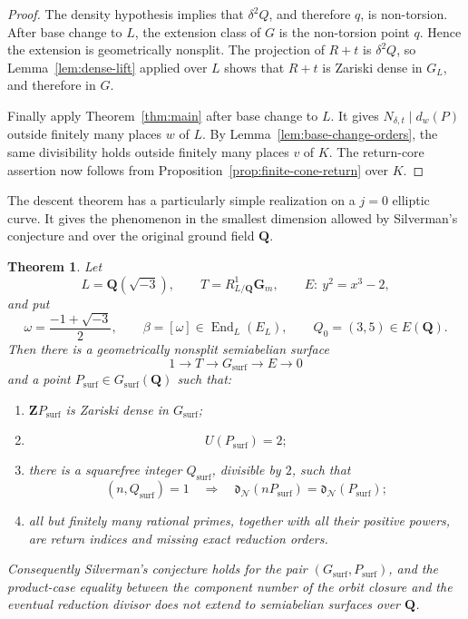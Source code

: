 \documentclass[11pt,letterpaper,reqno]{amsart}
\newtheorem{theorem}{Theorem}[section]
\theoremstyle{definition}
\theoremstyle{remark}
\newcommand{\Gm}{\mathbf G_m}
\newcommand{\Q}{\mathbf Q}
\newcommand{\End}{\operatorname{End}}
\newcommand{\dd}{\mathfrak d}
\newcommand{\Ner}{\mathcal N}
\begin{document}
\begin{proof}
The density hypothesis implies that $\delta^2Q$, and therefore $q$, is
non-torsion.  After base change to $L$, the extension class of $G$ is the
non-torsion point $q$.  Hence the extension is geometrically nonsplit.  The
projection of $R+t$ is $\delta^2Q$, so Lemma~\ref{lem:dense-lift} applied over
$L$ shows that $R+t$ is Zariski dense in $G_L$, and therefore in $G$.

Finally apply Theorem~\ref{thm:main} after base change to $L$.  It gives
$N_{\delta,t}\mid d_w(P)$ outside finitely many places $w$ of $L$.
By Lemma~\ref{lem:base-change-orders}, the same divisibility holds outside
finitely many places $v$ of $K$.  The return-core assertion now follows from
Proposition~\ref{prop:finite-cone-return} over $K$.
\end{proof}

The descent theorem has a particularly simple realization on a $j=0$ elliptic
curve.  It gives the phenomenon in the smallest dimension allowed by
Silverman's conjecture and over the original ground field $\Q$.

\begin{theorem}
\label{thm:surface-Q}
Let
\[
 L=\Q(\sqrt{-3}),
 \qquad
 T=R^1_{L/\Q}\Gm,
 \qquad
 E:\ y^2=x^3-2,
\]
and put
\[
 \omega=\frac{-1+\sqrt{-3}}2,
 \qquad
 \beta=[\omega]\in\End_L(E_L),
 \qquad
 Q_0=(3,5)\in E(\Q).
\]
Then there is a geometrically nonsplit semiabelian surface
\begin{equation}\label{eq:surface-extension}
 1\longrightarrow T\longrightarrow G_{\mathrm{surf}}
 \longrightarrow E\longrightarrow0
\end{equation}
and a point $P_{\mathrm{surf}}\in G_{\mathrm{surf}}(\Q)$ such that:
\begin{enumerate}[label=\textup{(\roman*)}]
\item $\mathbf ZP_{\mathrm{surf}}$ is Zariski dense in
      $G_{\mathrm{surf}}$;
\item
\[
 U(P_{\mathrm{surf}})=2;
\]
\item there is a squarefree integer $Q_{\mathrm{surf}}$, divisible by $2$,
      such that
\begin{equation}\label{eq:surface-return-core}
 (n,Q_{\mathrm{surf}})=1
 \quad\Longrightarrow\quad
 \dd_{\Ner}(nP_{\mathrm{surf}})
 =\dd_{\Ner}(P_{\mathrm{surf}});
\end{equation}
\item all but finitely many rational primes, together with all their positive
      powers, are return indices and missing exact reduction orders.
\end{enumerate}
Consequently Silverman's conjecture holds for the pair
$(G_{\mathrm{surf}},P_{\mathrm{surf}})$, and the product-case equality between
the component number of the orbit closure and the eventual reduction divisor
does not extend to semiabelian surfaces over $\Q$.
\end{theorem}
\end{document}
